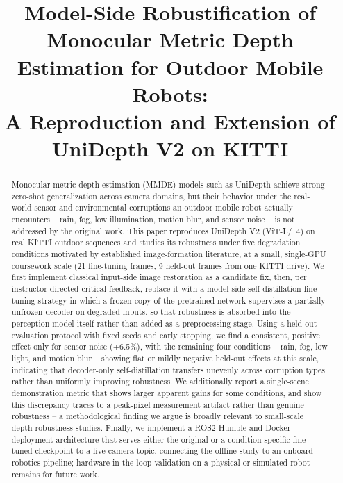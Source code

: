 \documentclass[conference]{IEEEtran}
\begin{document}
\title{Model-Side Robustification of Monocular Metric Depth Estimation for Outdoor Mobile Robots:\\
A Reproduction and Extension of UniDepth V2 on KITTI}

\author{
}

\maketitle

\begin{abstract}
Monocular metric depth estimation (MMDE) models such as UniDepth achieve strong zero-shot generalization across camera domains, but their behavior under the real-world sensor and environmental corruptions an outdoor mobile robot actually encounters -- rain, fog, low illumination, motion blur, and sensor noise -- is not addressed by the original work. This paper reproduces UniDepth V2 (ViT-L/14) on real KITTI outdoor sequences and studies its robustness under five degradation conditions motivated by established image-formation literature, at a small, single-GPU coursework scale (21 fine-tuning frames, 9 held-out frames from one KITTI drive). We first implement classical input-side image restoration as a candidate fix, then, per instructor-directed critical feedback, replace it with a model-side self-distillation fine-tuning strategy in which a frozen copy of the pretrained network supervises a partially-unfrozen decoder on degraded inputs, so that robustness is absorbed into the perception model itself rather than added as a preprocessing stage. Using a held-out evaluation protocol with fixed seeds and early stopping, we find a consistent, positive effect only for sensor noise (+6.5\%), with the remaining four conditions -- rain, fog, low light, and motion blur -- showing flat or mildly negative held-out effects at this scale, indicating that decoder-only self-distillation transfers unevenly across corruption types rather than uniformly improving robustness. We additionally report a single-scene demonstration metric that shows larger apparent gains for some conditions, and show this discrepancy traces to a peak-pixel measurement artifact rather than genuine robustness -- a methodological finding we argue is broadly relevant to small-scale depth-robustness studies. Finally, we implement a ROS2 Humble and Docker deployment architecture that serves either the original or a condition-specific fine-tuned checkpoint to a live camera topic, connecting the offline study to an onboard robotics pipeline; hardware-in-the-loop validation on a physical or simulated robot remains for future work.
\end{abstract}
\end{document}
